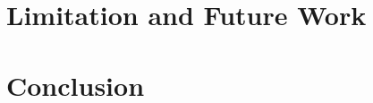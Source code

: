 \section{Limitation and Future Work}
\label{sec:limitation}

\section{Conclusion}
\label{sec:conclusion}
